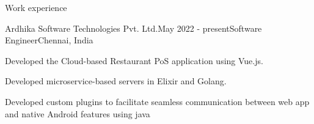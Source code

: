 \documentclass{resume} %
\begin{document}

\begin{rSection}{Work experience}

    \begin{rSubsection}{Ardhika Software Technologies Pvt. Ltd.}{May 2022 - present}{Software Engineer}{Chennai, India}
        \item Developed the Cloud-based Restaurant PoS application using Vue.js.
        \item Developed microservice-based servers in Elixir and Golang.
        \item Developed custom plugins to facilitate seamless communication between web app and native Android features using java
    \end{rSubsection}
    
    
    
\end{rSection}
\end{document}
